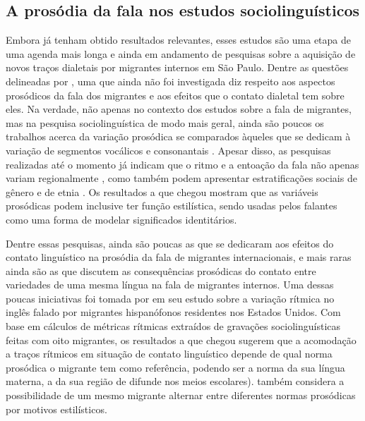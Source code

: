 \documentclass[
	a4paper,	%
	12pt,		%
	]{article}	%
\begin{document}
	\subsection{A prosódia da fala nos estudos sociolinguísticos} \label{prosodia-socio}

	Embora já tenham obtido resultados relevantes, esses estudos são uma etapa de uma agenda mais
	longa e ainda em andamento de pesquisas sobre a aquisição de novos traços dialetais por
	migrantes internos em São Paulo. Dentre as questões delineadas por \citet{Oushiro2018}, uma que
	ainda não foi investigada diz respeito aos aspectos prosódicos da fala dos migrantes e aos
	efeitos que o contato dialetal tem sobre eles. Na verdade, não apenas no contexto dos estudos
	sobre a fala de migrantes, mas na pesquisa sociolinguística de modo mais geral, ainda são poucos
	os trabalhos acerca da variação prosódica se comparados àqueles que se dedicam à variação de
	segmentos vocálicos e consonantais \citep{Thomas2013, Hay.Drager2007}. Apesar disso, as
	pesquisas realizadas até o momento já indicam que o ritmo e a entoação da fala não apenas variam
	regionalmente \citep{Clopper.Smiljanic2015, Grabe.etal2000}, como também podem apresentar
	estratificações sociais de gênero \citep{Lowry2011} e de etnia \citep{Thomas2013, Szakay2006}.
	Os resultados a que \citet{Podesva2011} chegou mostram que as variáveis prosódicas podem
	inclusive ter função estilística, sendo usadas pelos falantes como uma forma de modelar
	significados identitários.

	Dentre essas pesquisas, ainda são poucas as que se dedicaram aos efeitos do contato linguístico
	na prosódia da fala de migrantes internacionais, e mais raras ainda são as que discutem as
	consequências prosódicas do contato entre variedades de uma mesma língua na fala de migrantes
	internos. Uma dessas poucas iniciativas foi tomada por \citet{Carter2005} em seu estudo sobre a
	variação rítmica no inglês falado por migrantes hispanófonos residentes nos Estados Unidos. Com
	base em cálculos de métricas rítmicas extraídos de gravações sociolinguísticas feitas com oito
	migrantes, os resultados a que \citet{Carter2005} chegou sugerem que a acomodação a traços
	rítmicos em situação de contato linguístico depende de qual norma prosódica o migrante tem como
	referência, podendo ser a norma da sua língua materna, a da sua região de difunde nos meios
	escolares). \citet{Carter2005} também considera a possibilidade de um mesmo migrante alternar
	entre diferentes normas prosódicas por motivos estilísticos.
\end{document}
